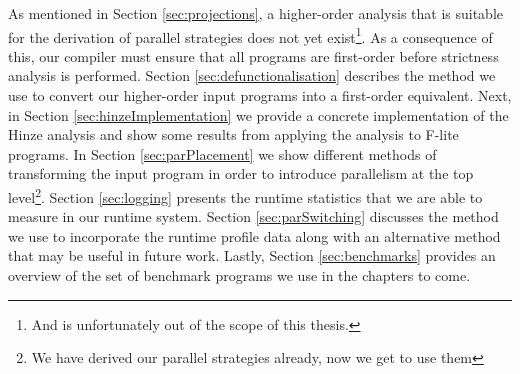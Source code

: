 As mentioned in Section \ref{sec:projections}, a higher-order analysis that is
suitable for the derivation of parallel strategies does not yet exist\footnote{
And is unfortunately out of the scope of this thesis.}. As a consequence of
this, our compiler must ensure that all programs are first-order before
strictness analysis is performed. Section \ref{sec:defunctionalisation}
describes the method we use to convert our higher-order input programs into a
first-order equivalent. Next, in Section \ref{sec:hinzeImplementation} we
provide a concrete implementation of the Hinze analysis and show some results
from applying the analysis to F-lite programs.  In Section
\ref{sec:parPlacement} we show different methods of transforming the input
program in order to introduce parallelism at the top level\footnote{We have
derived our parallel strategies already, now we get to use them}. Section
\ref{sec:logging} presents the runtime statistics that we are able to measure
in our runtime system. Section \ref{sec:parSwitching} discusses the method we
use to incorporate the runtime profile data along with an alternative method
that may be useful in future work. Lastly, Section \ref{sec:benchmarks}
provides an overview of the set of benchmark programs we use in the chapters to
come.
